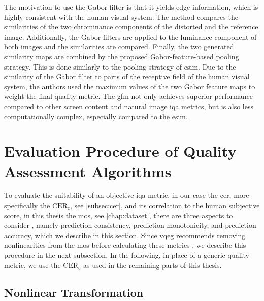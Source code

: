 The motivation to use the Gabor filter is that it yields edge information, which is highly consistent with the human visual system.
The method compares the similarities of the two chrominance components of the distorted and the reference image.
Additionally, the Gabor filters are applied to the luminance component of both images and the similarities are compared.
Finally, the two generated similarity maps are combined by the proposed Gabor-feature-based pooling strategy.
This is done similarly to the pooling strategy of \gls{esim}.
Due to the similarity of the Gabor filter to parts of the receptive field of the human visual system, the authors used the maximum values of the two Gabor feature maps to weight the final quality metric.
The \gls{gfm} not only achieves superior performance compared to other screen content and natural image \gls{iqa} metrics, but is also less computationally complex, especially compared to the \gls{esim}.



\section{Evaluation Procedure of Quality Assessment Algorithms}
\label{sec:evalprocedure}

To evaluate the suitability of an objective \gls{iqa} metric, in our case the \gls{cer}, more specifically the $\text{CER}_{\text{c}}$, see \autoref{subsec:cer}, and its correlation to the human subjective score, in this thesis the \gls{mos}, see \autoref{chap:dataset}, there are three aspects to consider \cite{nonlin_fit_original_2003}\cite{iqa_survey_2020}, namely prediction consistency, prediction monotonicity, and prediction accuracy, which we describe in this section.
Since \gls{vqeg} recommends removing nonlinearities from the \gls{mos} before calculating these metrics \cite{nonlin_fit_original_2003}, we describe this procedure in the next subsection.
In the following, in place of a generic quality metric, we use the $\text{CER}_{\text{c}}$ as used in the remaining parts of this thesis.

\subsection{Nonlinear Transformation}
\label{subsec:nonlinear}

